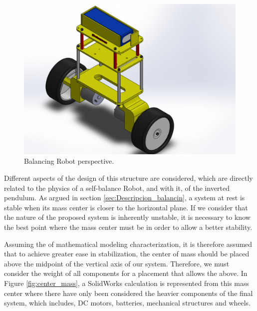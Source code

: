 \begin{center}
	\begin{figure}[H]
		\center
		\includegraphics[trim = 20mm 0mm 8cm 0mm,clip, angle=0, scale = 0.5]{imagenes/Balancing_Robot/EnsanBalanceCab.PDF}
		\caption{Balancing Robot perspective.}
		\label{fig:EnsanBalanceCab}
	\end{figure}
\end{center}

Different aspects of the design of this structure are considered, which are directly related to the physics of a self-balance Robot, and with it, of the inverted pendulum. \newline
As argued in section \ref{sec:Descripcion_balancin}, a system at rest is stable when its mass center is closer to the horizontal plane. If we consider that the nature of the proposed system is inherently unstable, it is necessary to know the best point where the mass center must be in order to allow a better stability. \newline

Assuming the of mathematical modeling characterization, it is therefore assumed that to achieve greater ease in stabilization, the center of mass should be placed above the midpoint of the vertical axis of our system. Therefore, we must consider the weight of all components for a placement that allows the above. \newline
In Figure \ref{fig:center_mass}, a SolidWorks calculation is represented from this mass center where there have only been considered the heavier components of the final system, which includes, DC motors, batteries, mechanical structures and wheels.

